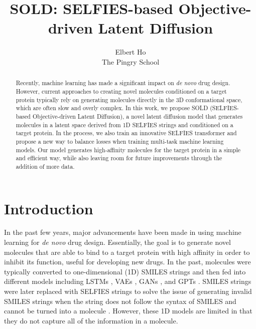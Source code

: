 \documentclass[11pt]{article}
\title{SOLD: SELFIES-based Objective-driven Latent Diffusion}
\author{Elbert Ho \\ The Pingry School}
\date{}
\begin{document}
\linespread{1.5}
\maketitle
\thispagestyle{empty}
\newpage

\thispagestyle{empty}
\begin{abstract}
    Recently, machine learning has made a significant impact on 
    \textit{de novo} drug design. However, current approaches to creating 
    novel molecules conditioned on a target protein typically rely on generating 
    molecules directly in the 3D conformational space, which are often slow and overly complex.
    In this work, we propose SOLD (SELFIES-based Objective-driven Latent Diffusion), a novel 
    latent diffusion model that generates molecules in a latent space 
    derived from 1D SELFIES strings and conditioned on a target protein. In the 
    process, we also train an innovative SELFIES transformer and propose a new way to 
    balance losses when training multi-task machine learning models.
    Our model generates high-affinity molecules for the target protein 
    in a simple and efficient way, while also leaving room for 
    future improvements through the addition of more data. 
\end{abstract}
\newpage
\setcounter{page}{1}
\section{Introduction}

In the past few years, major advancements have been made in
using machine learning for
\textit{de novo} drug design. Essentially, the goal is to generate novel 
molecules that are able to bind to a target protein with high affinity in order 
to inhibit its function, useful for developing new drugs. 
In the past, molecules were 
typically converted to one-dimensional (1D) SMILES strings and then fed into 
different models including LSTMs \cite{ERTL17}, VAEs \cite{Bombarelli16}, 
GANs \cite{Guimaraes18}, and GPTs \cite{Li23}. 
SMILES strings were later replaced with SELFIES strings to solve
the issue of generating invalid SMILES strings when the string does not follow the syntax of 
SMILES and cannot be turned into a molecule \cite{Krenn19}.
However, these 1D models are limited 
in that they do not capture all of the information in a molecule. 
\end{document}
